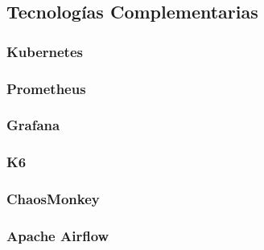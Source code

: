 \subsection{Tecnologías Complementarias}

\subsubsection{Kubernetes}

\subsubsection{Prometheus}

\subsubsection{Grafana}

\subsubsection{K6}

\subsubsection{ChaosMonkey}

\subsubsection{Apache Airflow}